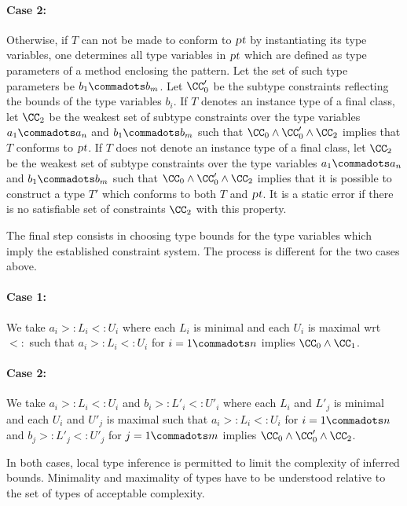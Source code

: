 \paragraph{Case 2:}
Otherwise, if $T$ can not be made to conform to $\mbox{\sl pt}$ by
instantiating its type variables, one determines all type variables in
$\mbox{\sl pt}$ which are defined as type parameters of a method enclosing
the pattern. Let the set of such type parameters be $b_1 \commadots
b_m$. Let $\CC'_0$ be the subtype constraints reflecting the bounds of the
type variables $b_i$.  If $T$ denotes an instance type of a final
class, let $\CC_2$ be the weakest set of subtype constraints over the type
variables $a_1 \commadots a_n$ and $b_1 \commadots b_m$ such that
$\CC_0 \wedge \CC'_0 \wedge \CC_2$ implies that $T$ conforms to
$\mbox{\sl pt}$.  If $T$ does not denote an instance type of a final class,
let $\CC_2$ be the weakest set of subtype constraints over the type variables
$a_1 \commadots a_n$ and $b_1 \commadots b_m$ such that $\CC_0 \wedge
\CC'_0 \wedge \CC_2$ implies that it is possible to construct a type
$T'$ which conforms to both $T$ and $\mbox{\sl pt}$. It is a static error if
there is no satisfiable set of constraints $\CC_2$ with this property.

The final step consists in choosing type bounds for the type
variables which imply the established constraint system. The process
is different for the two cases above.

\paragraph{Case 1:}
We take $a_i >: L_i <: U_i$ where each
$L_i$ is minimal and each $U_i$ is maximal wrt $<:$ such that
$a_i >: L_i <: U_i$ for $i = 1 \commadots n$ implies $\CC_0 \wedge \CC_1$.

\paragraph{Case 2:}
We take $a_i >: L_i <: U_i$ and $b_i >: L'_i <: U'_i$ where each $L_i$
and $L'_j$ is minimal and each $U_i$ and $U'_j$ is maximal such that
$a_i >: L_i <: U_i$ for $i = 1 \commadots n$ and 
$b_j >: L'_j <: U'_j$ for $j = 1 \commadots m$
implies $\CC_0 \wedge \CC'_0 \wedge \CC_2$.

In both cases, local type inference is permitted to limit the
complexity of inferred bounds. Minimality and maximality of types have
to be understood relative to the set of types of acceptable
complexity.

